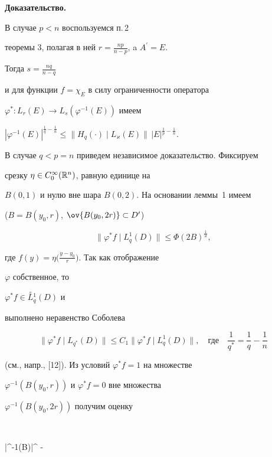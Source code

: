 {\bf Доказательство.}


В случае $p<n$ воспользуемся п.\,2


теоремы 3, полагая в ней $r=\frac{np}{n-p}$, a $A^{\prime}=E$.


Тогда $s=\frac{nq}{n-q}$


и для функции $f=\chi_E$ в силу ограниченности оператора


$\varphi^{\ast} : L_r(E)\to L_s(\varphi^{-1}(E))$ имеем


$|\varphi^{-1}(E)|^{\frac{1}{q} - \frac{1}{n}}


\leq \|H_q(\cdot)\mid L_\varkappa(E)\|\,|E|^{\frac{1}{p} - \frac{1}{n}}$.





В случае $q<p=n$ приведем независимое доказательство. Фиксируем


срезку $\eta\in C_{0}^{\infty}({\Bbb R}^n)$, равную единице на


$B(0,1)$ и нулю вне шара $B(0,2)$. На основании леммы~1 имеем


($B=B(y_0,r)$, $\ov{B(y_0,2r)}\subset D'$)


$$


\|\varphi^{\ast}f\mid L^1_q(D)\| \leq


{\Phi(2B)}^{\frac{1}{\varkappa}},


$$


где $f(y)=\eta\big(\frac{y-y_0}{r}\big)$. Так как отображение


$\varphi$ собственное, то


$\varphi^{\ast}f\in\overset{\circ}{L}{}^1_q(D)$ и


выполнено неравенство Соболева


$$


\|\varphi^{\ast}f\mid


L_{q^{\ast}}(D)\| \leq C_1 \|\varphi^{\ast}f\mid


L^1_q(D)\|,\quad\text{где}\quad


\frac{1}{q^{\ast}}=\frac{1}{q} -\frac{1}{n}


$$


(см., напр., [12]). Из условий $\varphi^{\ast}f=1$ на множестве


$\varphi^{-1}(B(y_0,r))$ и $\varphi^{\ast}f=0$ вне множества


$\varphi^{-1}(B(y_0,2r))$ получим оценку


$$


|\varphi^{-1}(B)|^{ - }\leq


